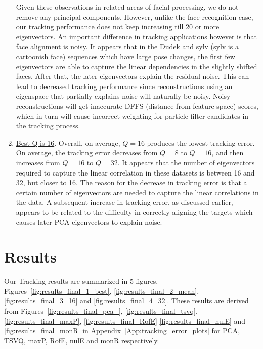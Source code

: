 \begin{enumerate}
Given these observations in related areas of facial processing, we do not remove any principal components.  However, unlike the face recognition case, our tracking performance does not keep increasing till 20 or more eigenvectors.  An important difference in tracking applications however is that face alignment is noisy.  It appears that in the Dudek and sylv (sylv is a cartoonish face) sequences which have large pose changes, the first few eigenvectors are able to capture the linear dependencies in the slightly shifted faces.  After that, the later eigenvectors explain the residual noise.  This can lead to decreased tracking performance since reconstructions using an eigenspace that partially explains noise will naturally be noisy.  Noisy reconstructions will get inaccurate DFFS (distance-from-feature-space) scores, which in turn will cause incorrect weighting for particle filter candidates in the tracking process.
\item \underline{Best Q is 16}.  Overall, on average, $Q=16$ produces the lowest tracking error.  On average, the tracking error decreases from $Q=8$ to $Q=16$, and then increases from $Q=16$ to $Q=32$.  It appears that the number of eigenvectors required to capture the linear correlation in these datasets is between 16 and 32, but closer to 16.   
The reason for the decrease in tracking error is that a certain number of eigenvectors are needed to capture the linear correlations in the data.  A subsequent increase in tracking error, as discussed earlier, appears to be related to the difficulty in correctly aligning the targets which causes later PCA eigenvectors to explain noise.
\end{enumerate}

\section{Results}
Our Tracking results are summarized in 5 figures, Figures~\ref{fig:results_final_1_best}, \ref{fig:results_final_2_mean}, \ref{fig:results_final_3_16} and \ref{fig:results_final_4_32}.  These results are derived from Figures~\ref{fig:results_final_pca_}, \ref{fig:results_final_tsvq}, \ref{fig:results_final_maxP}, \ref{fig:results_final_RofE} \ref{fig:results_final_nulE} and \ref{fig:results_final_monR} in Appendix~\ref{App:tracking_error_plots} for PCA, TSVQ, maxP, RofE, nulE and monR respectively.


